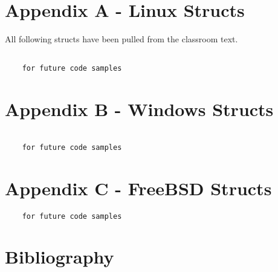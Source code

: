 \documentclass[10pt,letterpaper,onecolumn,draftclsnofoot]{IEEEtran}
\begin{document}
  \clearpage
  \section{Appendix A - Linux Structs}
  All following structs have been pulled from the classroom text. \cite{robertlove2010}
  \begin{lstlisting}

    for future code samples

  \end{lstlisting}

  \section{Appendix B - Windows Structs}
  \begin{lstlisting}

    for future code samples
  \end{lstlisting}
  \section{Appendix C - FreeBSD Structs}
  \begin{lstlisting}
    for future code samples

  \end{lstlisting}

  \section{Bibliography}
  
  
\end{document}
